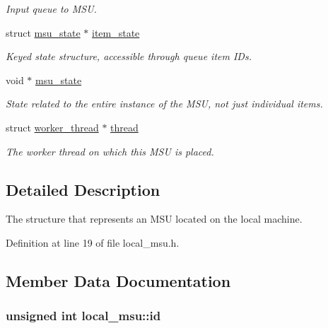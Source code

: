 \begin{DoxyCompactItemize}
\begin{DoxyCompactList}\small\item\em Input queue to M\-S\-U. \end{DoxyCompactList}\item 
struct \hyperlink{structmsu__state}{msu\-\_\-state} $\ast$ \hyperlink{structlocal__msu_a1f36b6678f46ffb35e60a8fd4a99a862}{item\-\_\-state}
\begin{DoxyCompactList}\small\item\em Keyed state structure, accessible through queue item I\-Ds. \end{DoxyCompactList}\item 
void $\ast$ \hyperlink{structlocal__msu_a4b540cc46b0cc35e4e7684f2d6af7c41}{msu\-\_\-state}
\begin{DoxyCompactList}\small\item\em State related to the entire instance of the M\-S\-U, not just individual items. \end{DoxyCompactList}\item 
struct \hyperlink{structworker__thread}{worker\-\_\-thread} $\ast$ \hyperlink{structlocal__msu_a8f2b8ca820e060261f888b3bcb01d222}{thread}
\begin{DoxyCompactList}\small\item\em The worker thread on which this M\-S\-U is placed. \end{DoxyCompactList}\end{DoxyCompactItemize}


\subsection{Detailed Description}
The structure that represents an M\-S\-U located on the local machine. 

Definition at line 19 of file local\-\_\-msu.\-h.



\subsection{Member Data Documentation}
\hypertarget{structlocal__msu_a1ca7fa0ae8f056072f5e92b895b7be1e}{
\subsubsection[{id}]{\setlength{\rightskip}{0pt plus 5cm}unsigned int local\-\_\-msu\-::id}}\label{structlocal__msu_a1ca7fa0ae8f056072f5e92b895b7be1e}


